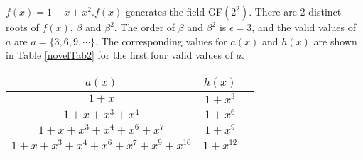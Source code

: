 \begin{example}
$f(x)=1+x+x^2$.\newline $f(x)$ generates the field GF$(2^2)$. There are 2 distinct roots of $f(x)$, $\beta$ and $\beta^2$. The order of $\beta$ and $\beta^2$ is $\epsilon=3$, and the  valid values of $a$ are $a=\{3,6,9,\cdots \}$. The corresponding values for $a(x)$ and $h(x)$ are shown in Table \ref{novelTab2} for the first four valid values of $a$.

 \begin{table*}[h!]
 \caption{$f(x)=1+x+x^2$}
\centering
 \begin{tabular}{c c c} 
 $a(x)$ & $h(x)$ \\ [0.5ex] 
 \hline\hline
$1+x$
 & $1+x^{3}$ \\
\hline
$1+x+x^3+x^4$
 & $1+x^{6}$ 
 \\
\hline
$1+x+x^3+x^4+x^6+x^{7}$ 
&  $1+x^{9}$ 
\\
\hline
$1+x+x^3+x^4+x^6+x^{7}+x^9+x^{10}$
 &  $1+x^{12}$ \\
 \end{tabular}
 \label{novelTab2}
\end{table*}
\end{example}

